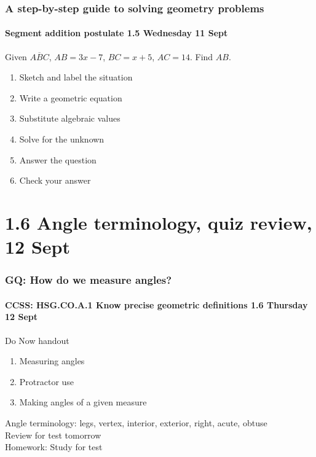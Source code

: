 \documentclass{beamer}
\begin{document}
  \frame
  {
    \frametitle{A step-by-step guide to solving geometry problems}
    \framesubtitle{Segment addition postulate \hfill \alert{1.5 Wednesday 11 Sept}}
    Given $\overline{ABC}$, $AB=3x-7$, $BC=x+5$, $AC=14$. Find ${AB}$.\\[0.5in]
        \vspace{1cm}
  \begin{enumerate}
      \item<2-> Sketch and label the situation\\
      \item<2-> Write a geometric equation\\
      \item<2-> Substitute algebraic values\\
      \item<2-> Solve for the unknown\\
      \item<2-> Answer the question\\
      \item<2-> Check your answer
    \end{enumerate}
  }
  
\section{1.6 Angle terminology, quiz review, 12 Sept}
  \frame
  {
    \frametitle{GQ: How do we measure angles?}
    \framesubtitle{CCSS: HSG.CO.A.1 Know precise geometric definitions \hfill \alert{1.6 Thursday 12 Sept}}

    \begin{block}{Do Now handout}
    \begin{enumerate}
        \item Measuring angles
        \item Protractor use
        \item Making angles of a given measure
    \end{enumerate}
    \end{block}
    Angle terminology: legs, vertex, interior, exterior, right, acute, obtuse\\
    Review for \alert{test tomorrow} \\
    \vspace{1cm}
    Homework: Study for test
  }
\end{document}
